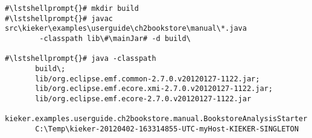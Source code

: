 \begin{lstlisting}[caption=Commands to compile and run the analysis under Windows,label=lst:bookstoreAnalysisStarterWin]
#\lstshellprompt{}# mkdir build
#\lstshellprompt{}# javac src\kieker\examples\userguide\ch2bookstore\manual\*.java 
        -classpath lib\#\mainJar# -d build\

#\lstshellprompt{}# java -classpath 
       build\;
       lib/org.eclipse.emf.common-2.7.0.v20120127-1122.jar;
       lib/org.eclipse.emf.ecore.xmi-2.7.0.v20120127-1122.jar;
       lib/org.eclipse.emf.ecore-2.7.0.v20120127-1122.jar
       kieker.examples.userguide.ch2bookstore.manual.BookstoreAnalysisStarter 
       C:\Temp\kieker-20120402-163314855-UTC-myHost-KIEKER-SINGLETON
\end{lstlisting}	
